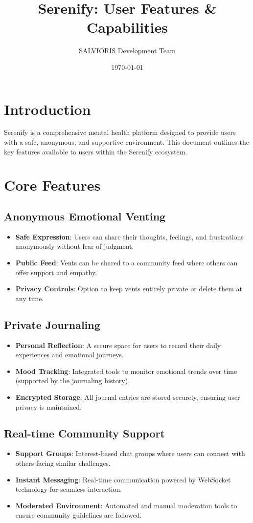 \documentclass[11pt,a4paper]{article}
\title{\textbf{Serenify: User Features \& Capabilities}}
\author{SALVIORIS Development Team}
\date{\today}
\begin{document}
\maketitle

\section{Introduction}
Serenify is a comprehensive mental health platform designed to provide users with a safe, anonymous, and supportive environment. This document outlines the key features available to users within the Serenify ecosystem.

\section{Core Features}

\subsection{Anonymous Emotional Venting}
\begin{itemize}
    \item \textbf{Safe Expression}: Users can share their thoughts, feelings, and frustrations anonymously without fear of judgment.
    \item \textbf{Public Feed}: Vents can be shared to a community feed where others can offer support and empathy.
    \item \textbf{Privacy Controls}: Option to keep vents entirely private or delete them at any time.
\end{itemize}

\subsection{Private Journaling}
\begin{itemize}
    \item \textbf{Personal Reflection}: A secure space for users to record their daily experiences and emotional journeys.
    \item \textbf{Mood Tracking}: Integrated tools to monitor emotional trends over time (supported by the journaling history).
    \item \textbf{Encrypted Storage}: All journal entries are stored securely, ensuring user privacy is maintained.
\end{itemize}

\subsection{Real-time Community Support}
\begin{itemize}
    \item \textbf{Support Groups}: Interest-based chat groups where users can connect with others facing similar challenges.
    \item \textbf{Instant Messaging}: Real-time communication powered by WebSocket technology for seamless interaction.
    \item \textbf{Moderated Environment}: Automated and manual moderation tools to ensure community guidelines are followed.
\end{itemize}
\end{document}
